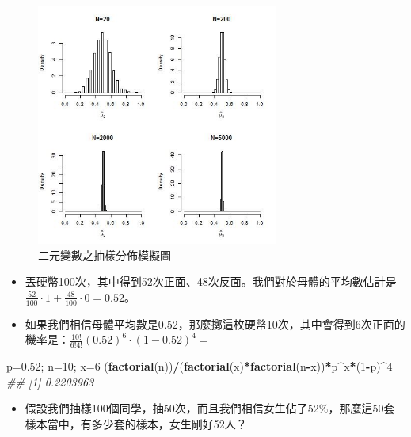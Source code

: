 \documentclass[hyperref,]{ctexart}
\newenvironment{Shaded}{\begin{snugshade}}{\end{snugshade}}
\newcommand{\CommentTok}[1]{\textcolor[rgb]{0.56,0.35,0.01}{\textit{#1}}}
\newcommand{\DecValTok}[1]{\textcolor[rgb]{0.00,0.00,0.81}{#1}}
\newcommand{\FloatTok}[1]{\textcolor[rgb]{0.00,0.00,0.81}{#1}}
\newcommand{\KeywordTok}[1]{\textcolor[rgb]{0.13,0.29,0.53}{\textbf{#1}}}
\newcommand{\NormalTok}[1]{#1}
\newcommand{\OperatorTok}[1]{\textcolor[rgb]{0.81,0.36,0.00}{\textbf{#1}}}
\providecommand{\tightlist}{%
  \setlength{\itemsep}{0pt}\setlength{\parskip}{0pt}}
\begin{document}
\begin{figure}
\centering
\includegraphics[width=\textwidth,height=3.125in]{./Fig/unbiasbinomial41.jpg}
\caption{二元變數之抽樣分佈模擬圖}
\end{figure}

\begin{itemize}
\item
  丟硬幣100次，其中得到52次正面、48次反面。我們對於母體的平均數估計是\(\frac{52}{100}\cdot 1+\frac{48}{100}\cdot 0=0.52\)。
\item
  如果我們相信母體平均數是0.52，那麼擲這枚硬幣10次，其中會得到6次正面的機率是：\(\frac{10!}{6!4!}(0.52)^6\cdot (1-0.52)^4=\)
\end{itemize}

\begin{Shaded}
\begin{Highlighting}[]
\NormalTok{p=}\FloatTok{0.52}\NormalTok{; n=}\DecValTok{10}\NormalTok{; x=}\DecValTok{6}
\NormalTok{(}\KeywordTok{factorial}\NormalTok{(n))}\OperatorTok{/}\NormalTok{(}\KeywordTok{factorial}\NormalTok{(x)}\OperatorTok{*}\KeywordTok{factorial}\NormalTok{(n}\OperatorTok{-}\NormalTok{x))}\OperatorTok{*}\NormalTok{p}\OperatorTok{^}\NormalTok{x}\OperatorTok{*}\NormalTok{(}\DecValTok{1}\OperatorTok{-}\NormalTok{p)}\OperatorTok{^}\DecValTok{4}
\CommentTok{## [1] 0.2203963}
\end{Highlighting}
\end{Shaded}

\begin{itemize}
\tightlist
\item
  假設我們抽樣100個同學，抽50次，而且我們相信女生佔了52\%，那麼這50套樣本當中，有多少套的樣本，女生剛好52人？
\end{itemize}
\end{document}
